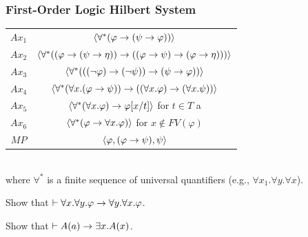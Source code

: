 \documentclass[english, 11pt]{article}
\begin{document}
  \subsubsection{First-Order Logic Hilbert System}
  \begin{center}
    \begin{tabular}{c | c}
      $Ax_1$ & $\langle \forall^* (\varphi \rightarrow (\psi \rightarrow \varphi))\rangle$ \\[1ex]
      $Ax_2$ & $\langle \forall^* ((\varphi \rightarrow (\psi \rightarrow \eta )) \rightarrow ((\varphi \rightarrow \psi) \rightarrow (\varphi \rightarrow \eta))) \rangle$ \\[1ex]
      $Ax_3$ & $\langle \forall^* ((( \neg \varphi) \rightarrow (\neg \psi)) \rightarrow (\psi \rightarrow \varphi))\rangle$ \\[1ex]
      $Ax_4$ & $\langle \forall^* (\forall x.(\varphi \rightarrow \psi)) \rightarrow ((\forall x.\varphi) \rightarrow (\forall x.\psi))\rangle$ \\[1ex]
      $Ax_5$ & $\langle \forall^* (\forall x .\varphi) \rightarrow \varphi[x/t]\rangle$ for $t \in T$ a \nameref{terms} \\[1ex]
      $Ax_6$ & $\langle \forall^* (\varphi \rightarrow \forall x . \varphi)\rangle$ for $x \not \in FV(\varphi)$ \\[1ex]
      $MP$ & $\langle \varphi, (\varphi \rightarrow \psi), \psi\rangle$
    \end{tabular} \\[1ex]
    where $\forall^*$ is a finite sequence of universal quantifiers (e.g., $\forall x_1.\forall y.\forall x$).
  \end{center}

  \begin{exmp}
    Show that $\vdash \forall x. \forall y. \varphi \rightarrow \forall y. \forall x. \varphi$.
    \begin{flagderiv}
    \end{flagderiv}
  \end{exmp}

  \begin{exmp}
    Show that $\vdash A(a) \rightarrow \exists x.A(x)$.
    \begin{flagderiv}
    \end{flagderiv}
  \end{exmp}
\end{document}
